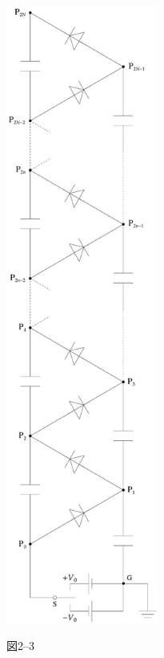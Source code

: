 \begin{minipage}{0.4\linewidth}
  \centering
  \begin{figure}[H]
    \centering
    \includegraphics[width=5cm]{fig/fig_4_19_3.pdf}

    {図2--3}
  \end{figure}
\end{minipage}




